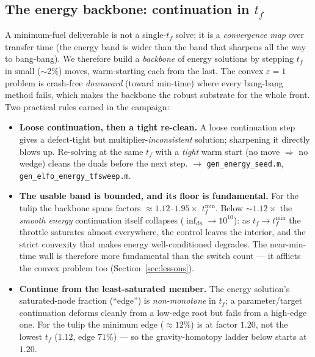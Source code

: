 \documentclass[11pt]{article}
\newcommand{\file}[1]{\texttt{\small #1}}
\begin{document}
\subsection{The energy backbone: continuation in $t_f$}\label{sec:backbone}
A minimum-fuel deliverable is not a single-$t_f$ solve; it is a \emph{convergence
map} over transfer time (the energy band is wider than the band that sharpens all
the way to bang-bang). We therefore build a \emph{backbone} of energy solutions
by stepping $t_f$ in small ($\sim$2\%) moves, warm-starting each from the last.
The convex $\varepsilon=1$ problem is crash-free \emph{downward} (toward
min-time) where every bang-bang method fails, which makes the backbone the
robust substrate for the whole front. Two practical rules earned in the campaign:
\begin{itemize}
  \item \textbf{Loose continuation, then a tight re-clean.} A loose continuation
        step gives a defect-tight but multiplier-\emph{inconsistent} solution;
        sharpening it directly blows up. Re-solving at the same $t_f$ with a
        \emph{tight} warm start (no move $\Rightarrow$ no wedge) cleans the duals
        before the next step. $\rightarrow$ \file{gen\_energy\_seed.m},
        \file{gen\_elfo\_energy\_tfsweep.m}.
  \item \textbf{The usable band is bounded, and its floor is fundamental.} For
        the tulip the backbone spans factors $\approx1.12$--$1.95\times$
        $t_f^{\min}$. Below $\sim1.12\times$ the \emph{smooth energy}
        continuation itself collapses ($\inf_{du}\!\to\!10^{10}$): as $t_f\to
        t_f^{\min}$ the throttle saturates almost everywhere, the control leaves
        the interior, and the strict convexity that makes energy well-conditioned
        degrades. The near-min-time wall is therefore more fundamental than the
        switch count --- it afflicts the convex problem too (Section~\ref{sec:lessons}).
  \item \textbf{Continue from the least-saturated member.} The energy solution's
        saturated-node fraction (``edge'') is \emph{non-monotone} in $t_f$; a
        parameter/target continuation deforms cleanly from a low-edge root but
        fails from a high-edge one. For the tulip the minimum edge ($\approx12\%$)
        is at factor $1.20$, not the lowest $t_f$ ($1.12$, edge $71\%$) --- so
        the gravity-homotopy ladder below starts at $1.20$.
\end{itemize}
\end{document}
